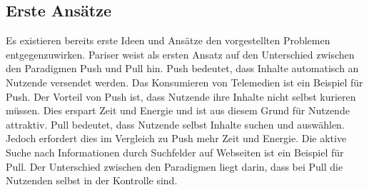 \subsection{Erste Ansätze}
Es existieren bereits erste Ideen und Ansätze den vorgestellten Problemen entgegenzuwirken.
Pariser weist als ersten Ansatz auf den Unterschied zwischen den Paradigmen Push und Pull hin.
Push bedeutet, dass Inhalte automatisch an Nutzende versendet werden.
Das Konsumieren von Telemedien ist ein Beispiel für Push.
Der Vorteil von Push ist, dass Nutzende ihre Inhalte nicht selbst kurieren müssen.
Dies erspart Zeit und Energie und ist aus diesem Grund für Nutzende attraktiv.
Pull bedeutet, dass Nutzende selbst Inhalte suchen und auswählen.
Jedoch erfordert dies im Vergleich zu Push mehr Zeit und Energie.
Die aktive Suche nach Informationen durch Suchfelder auf Webseiten ist ein Beispiel für Pull.
Der Unterschied zwischen den Paradigmen liegt darin, dass bei Pull die Nutzenden selbst in der Kontrolle sind.\\






